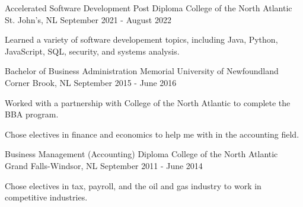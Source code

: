 

\begin{cventries}

  \cventry
    {Accelerated Software Development Post Diploma} %
    {College of the North Atlantic} %
    {St. John's, NL} %
    {September 2021 - August 2022} %
    {
      \begin{cvitems} %
        \item {Learned a variety of software developement topics, including Java, Python, JavaScript, SQL, security, and systems analysis.}
      \end{cvitems}
    }
	
  \cventry
    {Bachelor of Business Administration} %
    {Memorial University of Newfoundland} %
    {Corner Brook, NL} %
    {September 2015 - June 2016} %
    {
      \begin{cvitems} %
        \item {Worked with a partnership with College of the North Atlantic to complete the BBA program.}
		\item {Chose electives in finance and economics to help me with in the accounting field.}
      \end{cvitems}
    }
	
  \cventry
    {Business Management (Accounting) Diploma} %
    {College of the North Atlantic} %
    {Grand Falls-Windsor, NL} %
    {September 2011 - June 2014} %
    {
      \begin{cvitems} %
        \item {Chose electives in tax, payroll, and the oil and gas industry to work in competitive industries.}
      \end{cvitems}
    }

\end{cventries}
